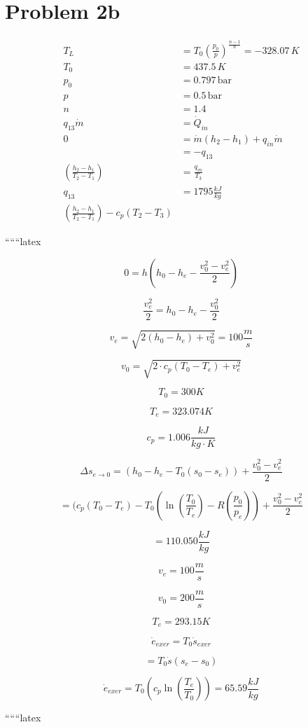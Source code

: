 \section*{Problem 2b}

\begin{align*}
    T_L &= T_0 \left( \frac{p_0}{p} \right)^{\frac{n-1}{n}} = -328.07 \, K \\
    T_0 &= 437.5 \, K \\
    p_0 &= 0.797 \, \text{bar} \\
    p &= 0.5 \, \text{bar} \\
    n &= 1.4 \\
    q_{13} \dot{m} &= \dot{Q}_{in} \\
    0 &= \dot{m} (h_2 - h_1) + q_{in} \dot{m} \\
    &= -q_{13} \\
    \left( \frac{h_2 - h_1}{T_2 - T_1} \right) &= \frac{q_{in}}{T_3} \\
    q_{13} &= 1795 \frac{kJ}{kg} \\
    \left( \frac{h_2 - h_1}{T_2 - T_1} \right) - c_p (T_2 - T_3)
\end{align*}

``````latex


\[
0 = h \left( h_0 - h_e - \frac{v_0^2 - v_e^2}{2} \right)
\]

\[
\frac{v_e^2}{2} = h_0 - h_e - \frac{v_0^2}{2}
\]

\[
v_e = \sqrt{2 \left( h_0 - h_e \right) + v_0^2} = 100 \frac{m}{s}
\]

\[
v_0 = \sqrt{2 \cdot c_p (T_0 - T_e) + v_e^2}
\]

\[
T_0 = 300 K
\]

\[
T_e = 323.074 K
\]

\[
c_p = 1.006 \frac{kJ}{kg \cdot K}
\]

\[
\Delta s_{e \rightarrow 0} = (h_0 - h_e - T_0 (s_0 - s_e)) + \frac{v_0^2 - v_e^2}{2}
\]

\[
= (c_p (T_0 - T_e) - T_0 (\ln \left( \frac{T_0}{T_e} \right) - R \left( \frac{p_0}{p_e} \right)) + \frac{v_0^2 - v_e^2}{2}
\]

\[
= 110.050 \frac{kJ}{kg}
\]

\[
v_e = 100 \frac{m}{s}
\]

\[
v_0 = 200 \frac{m}{s}
\]

\[
T_e = 293.15 K
\]

\[
\dot{e}_{exer} = T_0 \dot{s}_{exer}
\]

\[
= T_0 \dot{s} (s_e - s_0)
\]

\[
\dot{e}_{exer} = T_0 \left( c_p \ln \left( \frac{T_e}{T_0} \right) \right) = 65.59 \frac{kJ}{kg}
\]

``````latex